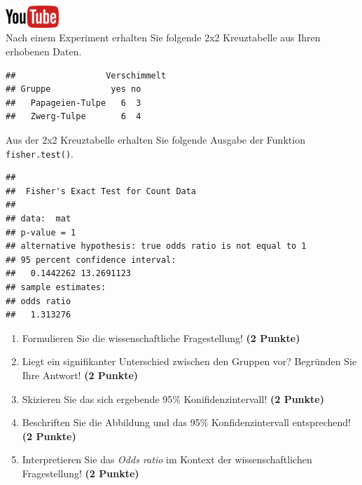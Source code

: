 \documentclass[a4paper, 9pt]{scrartcl}\usepackage[]{graphicx}\usepackage[]{xcolor}
\makeatletter
\newenvironment{kframe}{%
 \def\at@end@of@kframe{}%
 \ifinner\ifhmode%
  \def\at@end@of@kframe{\end{minipage}}%
  \begin{minipage}{\columnwidth}%
 \fi\fi%
 \def\FrameCommand##1{\hskip\@totalleftmargin \hskip-\fboxsep
 \colorbox{shadecolor}{##1}\hskip-\fboxsep
     \hskip-\linewidth \hskip-\@totalleftmargin \hskip\columnwidth}%
 \MakeFramed {\advance\hsize-\width
   \@totalleftmargin\z@ \linewidth\hsize
   \@setminipage}}%
 {\par\unskip\endMakeFramed%
 \at@end@of@kframe}
\newenvironment{knitrout}{}{} %
\makeatother
\begin{document}
\hfill\href{https://youtu.be/ghArbetOr_E}{\includegraphics[width =
  2cm]{img/youtube}}\\[1Ex]

Nach einem Experiment erhalten Sie folgende 2x2 Kreuztabelle aus Ihren
erhobenen Daten.

\begin{knitrout}
\color{fgcolor}\begin{kframe}
\begin{verbatim}
##                  Verschimmelt
## Gruppe            yes no
##   Papageien-Tulpe   6  3
##   Zwerg-Tulpe       6  4
\end{verbatim}
\end{kframe}
\end{knitrout}

Aus der 2x2 Kreuztabelle erhalten Sie folgende \Rlogo Ausgabe der Funktion
\texttt{fisher.test()}.

\begin{knitrout}
\color{fgcolor}\begin{kframe}
\begin{verbatim}
## 
## 	Fisher's Exact Test for Count Data
## 
## data:  mat
## p-value = 1
## alternative hypothesis: true odds ratio is not equal to 1
## 95 percent confidence interval:
##   0.1442262 13.2691123
## sample estimates:
## odds ratio 
##   1.313276
\end{verbatim}
\end{kframe}
\end{knitrout}


\begin{enumerate}
\item Formulieren Sie die wissenschaftliche Fragestellung! \textbf{(2 Punkte)}
\item Liegt ein signifikanter Unterschied zwischen den Gruppen vor?
  Begr{\"u}nden Sie Ihre Antwort! \textbf{(2 Punkte)}
\item Skizieren Sie das sich ergebende 95\% Konifidenzintervall! \textbf{(2 Punkte)}
\item Beschriften Sie die Abbildung und
  das 95\% Konfidenzintervall entsprechend! \textbf{(2 Punkte)} 
\item Interpretieren Sie das \textit{Odds ratio} im Kontext der
  wissenschaftlichen Fragestellung! \textbf{(2 Punkte)} 
\end{enumerate}
 
\end{document}

